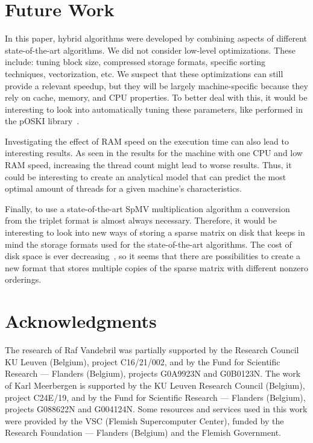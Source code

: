 \documentclass{siamart220329}
\begin{document}
\section{Future Work}\label{sec:futwork}
In this paper, hybrid algorithms were developed by combining aspects of different state-of-the-art algorithms. We did not consider low-level optimizations. These include: tuning block size, compressed storage formats, specific sorting techniques, vectorization, etc. We suspect that these optimizations can still provide a relevant speedup, but they will be largely machine-specific because they rely on cache, memory, and CPU properties. To better deal with this, it would be interesting to look into automatically tuning these parameters, like performed in the pOSKI library~\cite{pOSKI}.

Investigating the effect of RAM speed on the execution time can also lead to interesting results. As seen in the results for the machine with one CPU and low RAM speed, increasing the thread count might lead to worse results. Thus, it could be interesting to create an analytical model that can predict the most optimal amount of threads for a given machine's characteristics.

Finally, to use a state-of-the-art SpMV multiplication algorithm a conversion from the triplet format is almost always necessary. Therefore, it would be interesting to look into new ways of storing a sparse matrix on disk that keeps in mind the storage formats used for the state-of-the-art algorithms. The cost of disk space is ever decreasing~\cite{DiskPrice}, so it seems that there are possibilities to create a new format that stores multiple copies of the sparse matrix with different nonzero orderings.

\section*{Acknowledgments}
The research of Raf Vandebril was partially supported by the Research Council KU Leuven (Belgium), project C16/21/002, and by the Fund for Scientific Research --- Flanders (Belgium), projects G0A9923N and G0B0123N. The work of Karl Meerbergen is supported by the KU Leuven Research Council (Belgium), project C24E/19, and by the Fund for Scientific Research --- Flanders (Belgium), projects G088622N and G004124N. Some resources and services used in this work were provided by the VSC (Flemish Supercomputer Center), funded by the Research Foundation --- Flanders (Belgium) and the Flemish Government.




\end{document}

